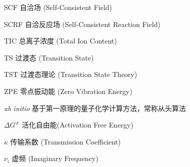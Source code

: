 \begin{denotation}[3cm]
  \item[SCF]自洽场 (Self-Consistent Field)
  \item[SCRF]自洽反应场 (Self-Consistent Reaction Field)
  \item[TIC]总离子浓度 (Total Ion Content)
  \item[TS]过渡态 (Transition State)
  \item[TST]过渡态理论 (Transition State Theory)
  \item[ZPE]零点振动能 (Zero Vibration Energy)
  \item[\textit{ab initio}]基于第一原理的量子化学计算方法，常称从头算法
  \item[$\Delta G^\neq$]活化自由能(Activation Free Energy)
  \item[$\kappa$]传输系数 (Transmission Coefficient)
  \item[$\nu_i$]虚频 (Imaginary Frequency)
\end{denotation}





